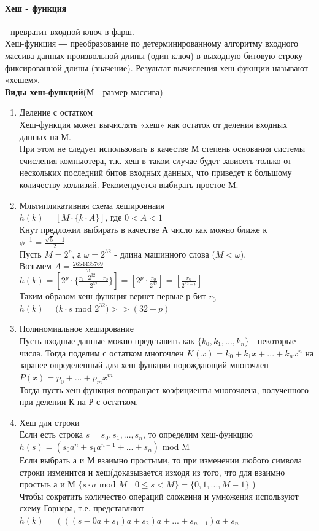 \documentclass[a4paper,10pt]{article}
\begin{document}
\paragraph{Хеш - функция} - превратит входной ключ в фарш.\\
Хеш-функция ― преобразование по детерминированному алгоритму входного массива данных произвольной длины (один ключ) в выходную битовую строку фиксированной длины (значение). Результат вычисления хеш-фукнции называют «хешем».\\
\textbf{Виды хеш-функций}(М - размер массива)
\begin{enumerate}
	\item Деление с остатком\\
Хеш-функция может вычислять «хеш» как остаток от деления входных данных на М.\\
При этом не следует использовать в качестве М степень основания системы счисления компьютера, т.к. хеш в таком случае будет зависеть только от нескольких последний битов входных данных, что приведет к большому количеству коллизий. Рекомендуется выбирать простое М.
	\item Мльтипликативная схема хешировнаия\\
$h(k) = [M \cdot \{ k \cdot A \} ] $, где $0 < A < 1$\\
Кнут предложил выбирать в качестве А число как можно ближе к $\phi^{-1} = \frac{\sqrt{5} - 1}{2}$\\
Пусть $M = 2^{p}$, а $\omega = 2^{32}$ - длина машинного слова ($M < \omega$).\\
Возьмем $A = \frac{2654435769}{\omega}$\\ 
$h(k) = [2^{p} \cdot \{\frac{r_1 \cdot 2^{32} + r_0}{2^{32}}\}] = [2^p\cdot \frac{r_0}{2^{32}}] = [\frac{r_0}{2^{32-p}}]$\\
Таким образом хеш-функция вернет первые р бит $r_0$\\
$h(k) = (k\cdot s$ mod $2^{32}) >> (32 - p)$
	\item Полиномиальное хеширование\\
Пусть входные данные можно представить как $\{k_0, k_1, ..., k_n \}$ - некоторые числа. Тогда поделим с остатком многочлен $K(x) = k_0 + k_1x + ... + k_n x^n$ на заранее определенный для хеш-функции порождающий многочлен $P(x) = p_0 + ... + p_m x^m$\\
Тогда пусть хеш-функция возвращает коэфициенты многочлена, полученного при делении К на Р с остатком.
	\item Хеш для строки\\
Если есть строка $s = s_0, s_1, ..., s_n$, то определим хеш-функцию $h(s) = (s_0a^n + s_1a^{n-1} + ... + s_n)$ mod M\\
Если выбрать а и М взаимно простыми, то при изменении любого символа строки изменится и хеш(доказывается изходя из того, что для взаимно простыъ а и М $\{s\cdot a$ mod $M$ | $ 0\leq s < M\}=\{0, 1, ..., M-1\}$ )\\
Чтобы сократить количество операций сложения и умножения используют схему Горнера, т.е. представляют $h(k) = (((s-0a + s_1)a+s_2)a+ ... + s_{n-1})a+s_n$
\end{enumerate}
\end{document}
